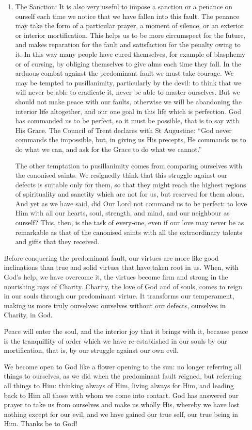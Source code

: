 \begin{enumerate}
\item The Sanction: It is also very useful to impose a sanction or a penance on ourself each time we notice that we have fallen into this fault. The penance may take the form of a particular prayer, a moment of silence, or an exterior or interior mortification. This helps us to be more circumspect for the future, and makes reparation for the fault and satisfaction for the penalty owing to it. In this way many people have cured themselves, for example of blasphemy or of cursing, by obliging themselves to give alms each time they fall. In the arduous combat against the predominant fault we must take courage. We may be tempted to pusillanimity, particularly by the devil: to think that we will never be able to eradicate it, never be able to master ourselves. But we should not make peace with our faults, otherwise we will be abandoning the interior life altogether, and our one goal in this life which is perfection. God has commanded us to be perfect, so it must be possible, that is to say with His Grace. The Council of Trent declares with St Augustine: ``God never commands the impossible, but, in giving us His precepts, He commands us to do what we can, and ask for the Grace to do what we cannot.''

The other temptation to pusillanimity comes from comparing ourselves with the canonised saints. We resignedly think that this struggle against our defects is suitable only for them, so that they might reach the highest regions of spirituality and sanctity which are not for us, but reserved for them alone. And yet as we have said, did Our Lord not command us to be perfect: to love Him with all our hearts, soul, strength, and mind, and our neighbour as ourself? This, then, is the task of every-one, even if our love may never be as remarkable as that of the canonised saints with all the extraordinary talents and gifts that they received. 

\end{enumerate}

Before conquering the predominant fault, our virtues are more like good inclinations than true and solid virtues that have taken root in us. When, with God's help, we have overcome it, the virtues become firm and strong in the nourishing rays of Charity. Charity, the love of God and of souls, comes to reign in our souls through our predominant virtue. It transforms our temperament, making us more truly ourselves: ourselves without our defects, ourselves in Charity, in God.

Peace will enter the soul, and the interior joy that it brings with it, because peace is the tranquillity of order which we have re-established in our souls by our mortification, that is, by our struggle against our own evil.

We become open to God like a flower opening to the sun: no longer referring all things to ourselves, as we did when the predominant fault reigned, but referring all things to Him: thinking always of Him, living always for Him, and leading back to Him all those with whom we come into contact. God has answered our prayer to take us from ourselves and make us wholly His, whereby we have lost nothing except for our evil, and we have gained our true self, our true being in Him. Thanks be to God!